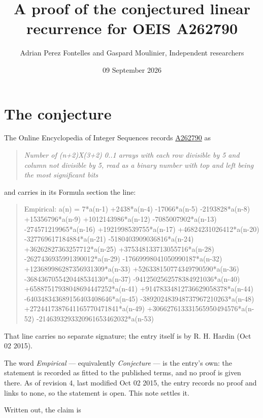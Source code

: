\documentclass[11pt]{article}
\title{A proof of the conjectured linear recurrence for OEIS A262790}
\author{Adrian Perez Fontelles and Gaspard Moulinier, Independent researchers}
\date{09 September 2026}
\theoremstyle{definition}
\begin{document}
\maketitle
\section{The conjecture}

The Online Encyclopedia of Integer Sequences records \href{https://oeis.org/A262790}{A262790} as

\begin{quote}\itshape Number of (n+2)X(3+2) 0..1 arrays with each row divisible by 5 and column not divisible by 5, read as a binary number with top and left being the most significant bits\end{quote}

and carries in its Formula section the line:

\begin{quote}\ttfamily Empirical: a(n) = 7*a(n-1) +2438*a(n-4) -17066*a(n-5) -2193828*a(n-8) +15356796*a(n-9) +1012143986*a(n-12) -7085007902*a(n-13) -274571219965*a(n-16) +1921998539755*a(n-17) +46824231026412*a(n-20) -327769617184884*a(n-21) -5180403909036816*a(n-24) +36262827363257712*a(n-25) +375348133713055716*a(n-28) -2627436935991390012*a(n-29) -17669998041050990187*a(n-32) +123689986287356931309*a(n-33) +526338150774349790590*a(n-36) -3684367055420448534130*a(n-37) -9412502562578384921036*a(n-40) +65887517938048694447252*a(n-41) +91478334812736629058378*a(n-44) -640348343689156403408646*a(n-45) -389202483948737967210263*a(n-48) +2724417387641165770471841*a(n-49) +306627613331565950494576*a(n-52) -2146393293320961653462032*a(n-53)\end{quote}

That line carries no separate signature; the entry itself is by R. H. Hardin (Oct 02 2015).

The word {\itshape Empirical} --- equivalently {\itshape Conjecture} --- is the entry's own: the statement is recorded as fitted to the published terms, and no proof is given there. As of revision 4, last modified Oct 02 2015, the entry records no proof and links to none, so the statement is open. This note settles it.

Written out, the claim is
\end{document}
